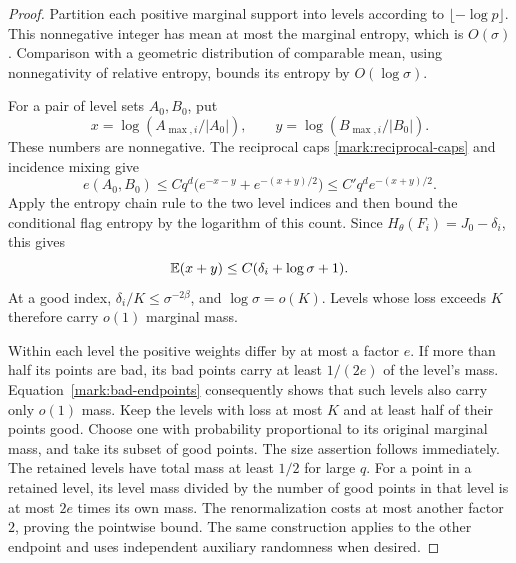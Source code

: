 \begin{proof}
Partition each positive marginal support into levels according to
\(\lfloor-\log p\rfloor\). This nonnegative integer has mean at
most the marginal entropy, which is \(O(\sigma)\). Comparison
with a geometric distribution of comparable mean, using
nonnegativity of relative entropy, bounds its entropy by
\(O(\log\sigma)\).

For a pair of level sets \(A_0,B_0\), put
\[
 x=\log(A_{\max,i}/|A_0|),\qquad
 y=\log(B_{\max,i}/|B_0|).
\]
These numbers are nonnegative. The reciprocal caps
\eqref{mark:reciprocal-caps} and incidence mixing give
\[
 e(A_0,B_0)
 \le Cq^d\bigl(e^{-x-y}+e^{-(x+y)/2}\bigr)
 \le C'q^d e^{-(x+y)/2}.
\]
Apply the entropy chain rule to the two level indices and then
bound the conditional flag entropy by the logarithm of this
count. Since \(H_\theta(F_i)=J_0-\delta_i\), this gives
\[
 \mathbb E(x+y)\le C(\delta_i+\log\sigma+1).
\]
At a good index, \(\delta_i/K\le\sigma^{-2\beta}\), and
\(\log\sigma=o(K)\). Levels whose loss exceeds \(K\)
therefore carry \(o(1)\) marginal mass.

Within each level the positive weights differ by at most a
factor \(e\). If more than half its points are bad, its bad
points carry at least \(1/(2e)\) of the level's mass.
Equation~\eqref{mark:bad-endpoints} consequently shows that
such levels also carry only \(o(1)\) mass.
Keep the levels with loss at most \(K\) and at least half of
their points good. Choose one with probability proportional
to its original marginal mass, and take its subset of good
points. The size assertion follows immediately.
The retained levels have total mass at least \(1/2\) for
large \(q\). For a point in a retained level, its level mass
divided by the number of good points in that level is at
most \(2e\) times its own mass. The renormalization costs at
most another factor \(2\), proving the pointwise bound.
The same construction applies to the other endpoint and uses
independent auxiliary randomness when desired.
\end{proof}


